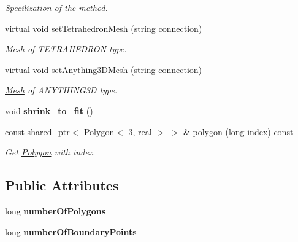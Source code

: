 \begin{DoxyCompactItemize}
\begin{DoxyCompactList}\small\item\em Specilization of the method. \end{DoxyCompactList}\item 
virtual void \hyperlink{class_mesh3_d_ad2ce515add93ae41902537fba24a09a2}{set\+Tetrahedron\+Mesh} (string connection)
\begin{DoxyCompactList}\small\item\em \hyperlink{class_mesh}{Mesh} of T\+E\+T\+R\+A\+H\+E\+D\+R\+ON type. \end{DoxyCompactList}\item 
virtual void \hyperlink{class_mesh3_d_a449dba8699a5e4e1ab101a79e411f443}{set\+Anything3\+D\+Mesh} (string connection)
\begin{DoxyCompactList}\small\item\em \hyperlink{class_mesh}{Mesh} of A\+N\+Y\+T\+H\+I\+N\+G3D type. \end{DoxyCompactList}\item 
void {\bfseries shrink\+\_\+to\+\_\+fit} ()\hypertarget{class_mesh3_d_a9cdf6867d5a6c53ab50d793360b00132}{}\label{class_mesh3_d_a9cdf6867d5a6c53ab50d793360b00132}

\item 
const shared\+\_\+ptr$<$ \hyperlink{class_polygon}{Polygon}$<$ 3, real $>$ $>$ \& \hyperlink{class_mesh3_d_ac43faf1c99509f0aba384eda248202f9}{polygon} (long index) const \hypertarget{class_mesh3_d_ac43faf1c99509f0aba384eda248202f9}{}\label{class_mesh3_d_ac43faf1c99509f0aba384eda248202f9}

\begin{DoxyCompactList}\small\item\em Get \hyperlink{class_polygon}{Polygon} with index. \end{DoxyCompactList}\end{DoxyCompactItemize}
\subsection*{Public Attributes}
\begin{DoxyCompactItemize}
\item 
long {\bfseries number\+Of\+Polygons}\hypertarget{class_mesh3_d_a4d5bd1d28908b333881fa0d9f8f50a9b}{}\label{class_mesh3_d_a4d5bd1d28908b333881fa0d9f8f50a9b}

\item 
long {\bfseries number\+Of\+Boundary\+Points}\hypertarget{class_mesh3_d_a9a047727135fd08147e4eeadc1f20f96}{}\label{class_mesh3_d_a9a047727135fd08147e4eeadc1f20f96}

\end{DoxyCompactItemize}
